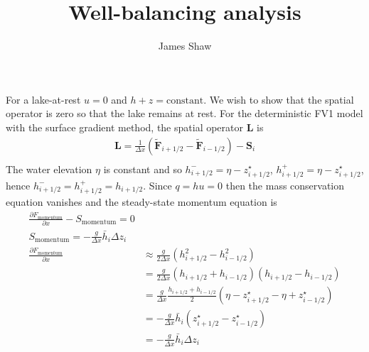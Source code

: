 \documentclass{article}
\title{Well-balancing analysis}
\author{James Shaw}
\newcommand{\riemannflux}{\widetilde{\vect{F}}}
\newcommand{\source}{\vect{S}}
\newcommand{\vect}{\mathbf}
\newcommand{\zstar}{z^\star}
\begin{document}
For a lake-at-rest $u=0$ and $h + z = \text{constant}$.  We wish to show that the spatial operator is zero so that the lake remains at rest.
For the deterministic FV1 model with the surface gradient method, the spatial operator $\vect{L}$ is
\begin{align}
\vect{L} = \frac{1}{\Delta x} \left( \riemannflux_{i+1/2} - \riemannflux_{i-1/2} \right) - \source_i\\
\end{align}
The water elevation $\eta$ is constant and so $h_{i+1/2}^- = \eta - \zstar_{i+1/2}$, $h_{i+1/2}^+ = \eta - \zstar_{i+1/2}$, hence $h_{i+1/2}^- = h_{i+1/2}^+ = h_{i+1/2}$.
Since $q = hu = 0 $ then the mass conservation equation vanishes and the steady-state momentum equation is
\begin{align}
	\frac{\partial F_\mathrm{momentum}}{\partial x} - S_\mathrm{momentum} = 0 \\
	S_\mathrm{momentum} = - \frac{g}{\Delta x} \bar{h}_i \Delta z_i \\
	\frac{\partial F_\mathrm{momentum}}{\partial x} &\approx \frac{g}{2\Delta x} \left( h_{i+1/2}^2 - h_{i-1/2}^2 \right) \\
	&= \frac{g}{2 \Delta x} \left( h_{i+1/2} + h_{i-1/2} \right) \left( h_{i+1/2} - h_{i-1/2} \right) \\
	&= \frac{g}{\Delta x} \frac{h_{i+1/2} + h_{i-1/2}}{2} \left( \eta - \zstar_{i+1/2} - \eta + \zstar_{i-1/2} \right) \\
	&= - \frac{g}{\Delta x} \bar{h}_i \left( \zstar_{i+1/2} - \zstar_{i-1/2} \right) \\
	&= - \frac{g}{\Delta x} \bar{h}_i \Delta z_i
\end{align}
\end{document}
